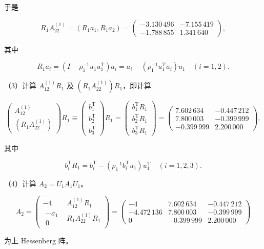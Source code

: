 于是

\[
R_1A_{22}^{(1)}=(R_1a_1,R_1a_2)
=\begin{pmatrix}-3.130\,496&-7.155\,419\\-1.788\,855&1.341\,640\end{pmatrix},
\]

其中

\[
R_1a_i=(I-\rho_1^{-1}u_1u_1^{\mathrm T})a_i
=a_i-(\rho_1^{-1}u_1^{\mathrm T}a_i)u_1\quad(i=1,2).
\]

（3）计算 \(A_{12}^{(1)}R_1\) 及 \((R_1A_{22}^{(1)})R_1\)，即计算

\[
\begin{pmatrix}A_{12}^{(1)}\\(R_1A_{22}^{(1)})\end{pmatrix}R_1
\equiv\begin{pmatrix}b_1^{\mathrm T}\\b_2^{\mathrm T}\\b_3^{\mathrm T}\end{pmatrix}R_1
=\begin{pmatrix}b_1^{\mathrm T}R_1\\b_2^{\mathrm T}R_1\\b_3^{\mathrm T}R_1\end{pmatrix}
=\begin{pmatrix}
7.602\,634&-0.447\,212\\
7.800\,003&-0.399\,999\\
-0.399\,999&2.200\,000
\end{pmatrix},
\]

其中

\[
b_i^{\mathrm T}R_1=b_i^{\mathrm T}-(\rho_1^{-1}b_i^{\mathrm T}u_1)u_1^{\mathrm T}
\quad(i=1,2,3).
\]

（4）计算 \(A_2=U_1A_1U_1\)。

\[
A_2=\begin{pmatrix}-4&A_{12}^{(1)}R_1\\
\begin{matrix}-\sigma_1\\0\end{matrix}&R_1A_{22}^{(1)}R_1
\end{pmatrix}
=\begin{pmatrix}
-4&7.602\,634&-0.447\,212\\
-4.472\,136&7.800\,003&-0.399\,999\\
0&-0.399\,999&2.200\,000
\end{pmatrix}
\]

为上 Hessenberg 阵。

